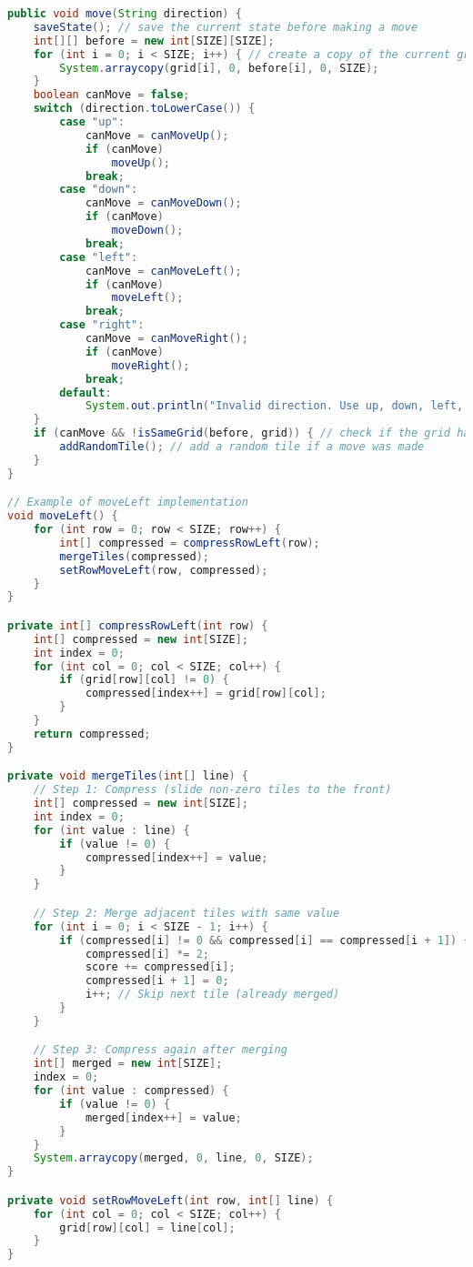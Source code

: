 \documentclass[12pt, a4paper]{article}
\begin{document}
\begin{lstlisting}[language=Java, caption=Move and Merge Algorithm]
public void move(String direction) {
    saveState(); // save the current state before making a move
    int[][] before = new int[SIZE][SIZE];
    for (int i = 0; i < SIZE; i++) { // create a copy of the current grid
        System.arraycopy(grid[i], 0, before[i], 0, SIZE);
    }
    boolean canMove = false;
    switch (direction.toLowerCase()) {
        case "up":
            canMove = canMoveUp();
            if (canMove)
                moveUp();
            break;
        case "down":
            canMove = canMoveDown();
            if (canMove)
                moveDown();
            break;
        case "left":
            canMove = canMoveLeft();
            if (canMove)
                moveLeft();
            break;
        case "right":
            canMove = canMoveRight();
            if (canMove)
                moveRight();
            break;
        default:
            System.out.println("Invalid direction. Use up, down, left, or right.");
    }
    if (canMove && !isSameGrid(before, grid)) { // check if the grid has changed
        addRandomTile(); // add a random tile if a move was made
    }
}

// Example of moveLeft implementation
void moveLeft() {
    for (int row = 0; row < SIZE; row++) {
        int[] compressed = compressRowLeft(row);
        mergeTiles(compressed);
        setRowMoveLeft(row, compressed);
    }
}

private int[] compressRowLeft(int row) {
    int[] compressed = new int[SIZE];
    int index = 0;
    for (int col = 0; col < SIZE; col++) {
        if (grid[row][col] != 0) {
            compressed[index++] = grid[row][col];
        }
    }
    return compressed;
}

private void mergeTiles(int[] line) {
    // Step 1: Compress (slide non-zero tiles to the front)
    int[] compressed = new int[SIZE];
    int index = 0;
    for (int value : line) {
        if (value != 0) {
            compressed[index++] = value;
        }
    }

    // Step 2: Merge adjacent tiles with same value
    for (int i = 0; i < SIZE - 1; i++) {
        if (compressed[i] != 0 && compressed[i] == compressed[i + 1]) {
            compressed[i] *= 2;
            score += compressed[i];
            compressed[i + 1] = 0;
            i++; // Skip next tile (already merged)
        }
    }

    // Step 3: Compress again after merging
    int[] merged = new int[SIZE];
    index = 0;
    for (int value : compressed) {
        if (value != 0) {
            merged[index++] = value;
        }
    }
    System.arraycopy(merged, 0, line, 0, SIZE);
}

private void setRowMoveLeft(int row, int[] line) {
    for (int col = 0; col < SIZE; col++) {
        grid[row][col] = line[col];
    }
}
\end{lstlisting}
\end{document}
